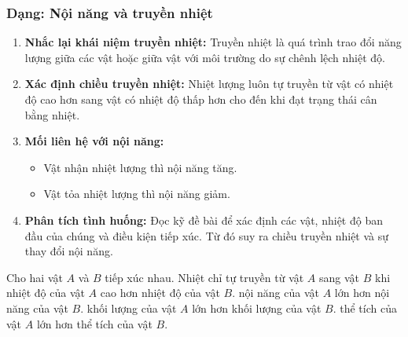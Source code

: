 \subsubsection{Dạng: Nội năng và truyền nhiệt}
\begin{phuongphap}
\begin{enumerate}
    \item \textbf{Nhắc lại khái niệm truyền nhiệt:} Truyền nhiệt là quá trình trao đổi năng lượng giữa các vật hoặc giữa vật với môi trường do sự chênh lệch nhiệt độ.
    \item \textbf{Xác định chiều truyền nhiệt:} Nhiệt lượng luôn tự truyền từ vật có nhiệt độ cao hơn sang vật có nhiệt độ thấp hơn cho đến khi đạt trạng thái cân bằng nhiệt.
    \item \textbf{Mối liên hệ với nội năng:}
    \begin{itemize}
        \item Vật nhận nhiệt lượng thì nội năng tăng.
        \item Vật tỏa nhiệt lượng thì nội năng giảm.
    \end{itemize}
    \item \textbf{Phân tích tình huống:} Đọc kỹ đề bài để xác định các vật, nhiệt độ ban đầu của chúng và điều kiện tiếp xúc. Từ đó suy ra chiều truyền nhiệt và sự thay đổi nội năng.
\end{enumerate}
\end{phuongphap}
\begin{vidumau}
Cho hai vật $A$ và $B$ tiếp xúc nhau. Nhiệt chỉ tự truyền từ vật $A$ sang vật $B$ khi
\choice
{\True nhiệt độ của vật $A$ cao hơn nhiệt độ của vật $B$.}
{nội năng của vật $A$ lớn hơn nội năng của vật $B$.}
{khối lượng của vật $A$ lớn hơn khối lượng của vật $B$.}
{thể tích của vật $A$ lớn hơn thể tích của vật $B$.}
\end{vidumau}

